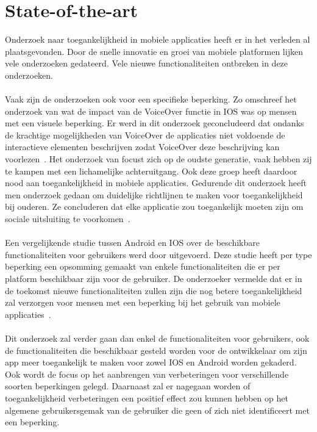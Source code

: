 
\section{State-of-the-art}
\label{sec:state-of-the-art}

Onderzoek naar toegankelijkheid in mobiele applicaties heeft er in het verleden al plaatsgevonden. Door de snelle innovatie en groei van mobiele platformen lijken vele onderzoeken gedateerd. Vele nieuwe functionaliteiten ontbreken in deze onderzoeken.
\\~\\
Vaak zijn de onderzoeken ook voor een specifieke beperking. Zo omschreef het onderzoek van \citeauthor{leporini2012interacting} wat de impact van de VoiceOver functie in IOS was op mensen met een visuele beperking. Er werd in dit onderzoek geconcludeerd dat ondanks de krachtige mogelijkheden van VoiceOver de applicaties niet voldoende de interactieve elementen beschrijven zodat VoiceOver deze beschrijving kan voorlezen~\autocite{leporini2012interacting}. Het onderzoek van \citeauthor{diaz2014accessibility} focust zich op de oudste generatie, vaak hebben zij te kampen met een lichamelijke achteruitgang. Ook deze groep heeft daardoor nood aan toegankelijkheid in mobiele applicaties. Gedurende dit onderzoek heeft men onderzoek gedaan om duidelijke richtlijnen te maken voor toegankelijkheid bij ouderen. Ze concluderen dat elke applicatie zou toegankelijk moeten zijn om sociale uitsluiting te voorkomen~\autocite{diaz2014accessibility}. 
\\~\\
Een vergelijkende studie tussen Android en IOS over de beschikbare functionaliteiten voor gebruikers werd door \citeauthor{10.1007/978-3-319-07638-6_14} uitgevoerd. Deze studie heeft per type beperking een opsomming gemaakt van enkele functionaliteiten die er per platform beschikbaar zijn voor de gebruiker. De onderzoeker vermelde dat er in de toekomst nieuwe functionaliteiten zullen zijn die nog betere toegankelijkheid zal verzorgen voor mensen met een beperking bij het gebruik van mobiele applicaties~\autocite{10.1007/978-3-319-07638-6_14}. 
\\~\\
Dit onderzoek zal verder gaan dan enkel de functionaliteiten voor gebruikers, ook de functionaliteiten die beschikbaar gesteld worden voor de ontwikkelaar om zijn app meer toegankelijk te maken voor zowel IOS en Android worden gekaderd. Ook wordt de focus op het aanbrengen van verbeteringen voor verschillende soorten beperkingen gelegd. Daarnaast zal er nagegaan worden of toegankelijkheid verbeteringen een positief effect zou kunnen hebben op het algemene gebruikersgemak van de gebruiker die geen of zich niet identificeert met een beperking.


